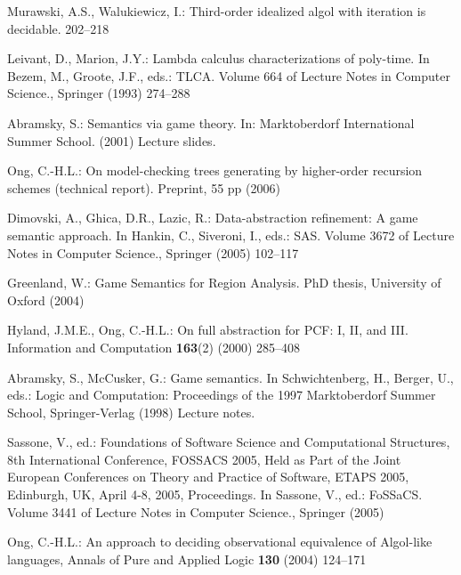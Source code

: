\documentclass{llncs}
\begin{document}
\begin{thebibliography}{10}
Murawski, A.S., Walukiewicz, I.:
\newblock Third-order idealized algol with iteration is decidable.
\newblock  \cite{DBLP:conf/fossacs/2005}  202--218

Leivant, D., Marion, J.Y.:
\newblock Lambda calculus characterizations of poly-time.
\newblock In Bezem, M., Groote, J.F., eds.: TLCA. Volume 664 of Lecture Notes
  in Computer Science., Springer (1993)  274--288

Abramsky, S.:
\newblock Semantics via game theory.
\newblock In: Marktoberdorf International Summer School. (2001) Lecture slides.

Ong, C.-H.L.:
\newblock On model-checking trees generating by higher-order recursion schemes
  (technical report).
\newblock Preprint, 55 pp (2006)

Dimovski, A., Ghica, D.R., Lazic, R.:
\newblock Data-abstraction refinement: A game semantic approach.
\newblock In Hankin, C., Siveroni, I., eds.: SAS. Volume 3672 of Lecture Notes
  in Computer Science., Springer (2005)  102--117

Greenland, W.:
\newblock Game Semantics for Region Analysis.
\newblock PhD thesis, University of Oxford (2004)

Hyland, J.M.E., Ong, C.-H.L.:
\newblock On full abstraction for {PCF}: {I, II, and III}.
\newblock Information and Computation \textbf{163}(2) (2000)  285--408

Abramsky, S., McCusker, G.:
\newblock Game semantics.
\newblock In Schwichtenberg, H., Berger, U., eds.: Logic and Computation:
  Proceedings of the 1997 Marktoberdorf Summer School, Springer-Verlag (1998)
  Lecture notes.

Sassone, V., ed.:
\newblock Foundations of Software Science and Computational Structures, 8th
  International Conference, FOSSACS 2005, Held as Part of the Joint European
  Conferences on Theory and Practice of Software, ETAPS 2005, Edinburgh, UK,
  April 4-8, 2005, Proceedings.
\newblock In Sassone, V., ed.: FoSSaCS. Volume 3441 of Lecture Notes in
  Computer Science., Springer (2005)

Ong, C.-H.L.:
\newblock An approach to deciding observational equivalence of Algol-like languages,
\newblock Annals of Pure and Applied Logic \textbf{130} (2004)  124--171
\end{thebibliography}
\end{document}
